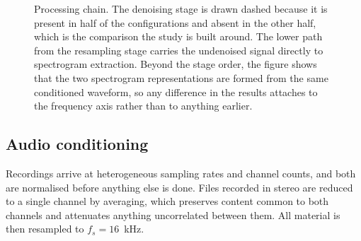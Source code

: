 \begin{figure}[t]
\centering
{}
\caption{Processing chain. The denoising stage is drawn dashed because it is
present in half of the configurations and absent in the other half, which is
the comparison the study is built around. The lower path from the resampling
stage carries the undenoised signal directly to spectrogram extraction.
Beyond the stage order, the figure shows that the two spectrogram
representations are formed from the same conditioned waveform, so any
difference in the results attaches to the frequency axis rather than to
anything earlier.}
\label{fig:pipeline}
\end{figure}

\subsection{Audio conditioning}\label{sec:d-cond}

Recordings arrive at heterogeneous sampling rates and channel counts, and both
are normalised before anything else is done. Files recorded in stereo are
reduced to a single channel by averaging, which preserves content common to
both channels and attenuates anything uncorrelated between them. All material
is then resampled to $f_s = 16$~kHz.

